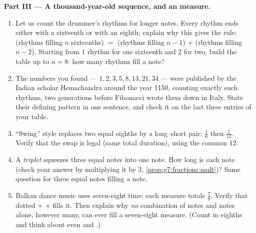 \begin{problem}
\medskip
\noindent\textbf{Part III --- A thousand-year-old sequence, and
an  measure.}
\begin{enumerate}[resume]
  \item Let us count the drummer's rhythms for longer notes.
        Every rhythm ends either with a sixteenth or with an
        eighth; explain why this gives the rule: (rhythms
        filling $n$ sixteenths) $=$ (rhythms filling $n - 1$)
        $+$ (rhythms filling $n - 2$). Starting from $1$ rhythm
        for one sixteenth and $2$ for two, build the table up to
        $n = 8$: how many rhythms fill a  note?
  \item The numbers you found --- $1, 2, 3, 5, 8, 13, 21, 34$
        --- were published by the Indian scholar Hemachandra
        around the year 1150, counting exactly such rhythms, two
        generations before Fibonacci wrote them down in Italy.
        State their defining pattern in one sentence, and check
        it on the last three entries of your table.
  \item ``Swing'' style replaces two equal eighths by a
        long--short pair: $\frac16$ then $\frac{1}{12}$. Verify
        that the swap is legal (same total duration), using the
        common  $12$.
  \item A \emph{triplet} squeezes three equal notes into one
         note. How long is each note (check your answer
        by multiplying it by $3$,
        \cref{prop:g7:fractions:mult})? Same question for three
        equal notes filling a  note.
  \item Balkan dance music uses seven-eight time: each measure
        totals $\frac78$. Verify that dotted  $+$ 
        $+$  fills it. Then explain why \emph{no}
        combination of  notes and  notes alone,
        however many, can ever fill a seven-eight measure.
        (Count in eighths and think about even and .)
\end{enumerate}
\end{problem}
